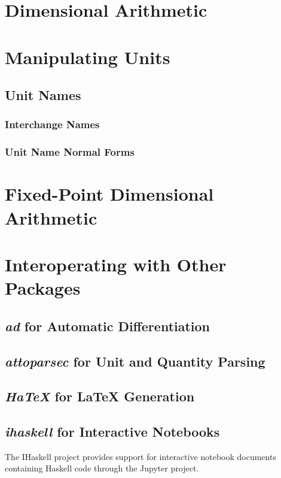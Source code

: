 \documentclass[12pt]{report}
\newcommand{\packagename}[1]{\textit{#1}}
\begin{document}
\chapter{Dimensional Arithmetic}

\chapter{Manipulating Units}

\section{Unit Names}

\subsection{Interchange Names}
\subsection{Unit Name Normal Forms}

\chapter{Fixed-Point Dimensional Arithmetic}

\chapter{Interoperating with Other Packages}

\section{\packagename{ad} for Automatic Differentiation}
\section{\packagename{attoparsec} for Unit and Quantity Parsing}
\section{\packagename{HaTeX} for \LaTeX{} Generation}
\section{\packagename{ihaskell} for Interactive Notebooks}

The IHaskell project provides support for interactive notebook documents containing
Haskell code through the Jupyter project.
\end{document}

